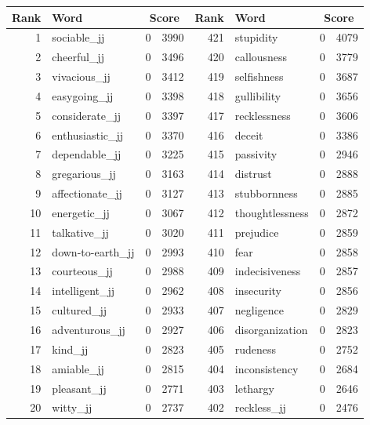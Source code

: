 \begin{table}[tbp]
    \begin{tabular}{| rlr@{.}l | rlr@{.}l |}
    \hline
    \textbf{Rank} & \textbf{Word} & \multicolumn{2}{c|}{\textbf{Score}} & \textbf{Rank} & \textbf{Word} & \multicolumn{2}{c|}{\textbf{Score}} \\
    \hline
    1 & sociable\_jj & 0 & 3990    &    421 & stupidity & 0 & 4079 \\
    2 & cheerful\_jj & 0 & 3496    &    420 & callousness & 0 & 3779 \\
    3 & vivacious\_jj & 0 & 3412    &    419 & selfishness & 0 & 3687 \\
    4 & easygoing\_jj & 0 & 3398    &    418 & gullibility & 0 & 3656 \\
    5 & considerate\_jj & 0 & 3397    &    417 & recklessness & 0 & 3606 \\
    6 & enthusiastic\_jj & 0 & 3370    &    416 & deceit & 0 & 3386 \\
    7 & dependable\_jj & 0 & 3225    &    415 & passivity & 0 & 2946 \\
    8 & gregarious\_jj & 0 & 3163    &    414 & distrust & 0 & 2888 \\
    9 & affectionate\_jj & 0 & 3127    &    413 & stubbornness & 0 & 2885 \\
    10 & energetic\_jj & 0 & 3067    &    412 & thoughtlessness & 0 & 2872 \\
    11 & talkative\_jj & 0 & 3020    &    411 & prejudice & 0 & 2859 \\
    12 & down-to-earth\_jj & 0 & 2993    &    410 & fear & 0 & 2858 \\
    13 & courteous\_jj & 0 & 2988    &    409 & indecisiveness & 0 & 2857 \\
    14 & intelligent\_jj & 0 & 2962    &    408 & insecurity & 0 & 2856 \\
    15 & cultured\_jj & 0 & 2933    &    407 & negligence & 0 & 2829 \\
    16 & adventurous\_jj & 0 & 2927    &    406 & disorganization & 0 & 2823 \\
    17 & kind\_jj & 0 & 2823    &    405 & rudeness & 0 & 2752 \\
    18 & amiable\_jj & 0 & 2815    &    404 & inconsistency & 0 & 2684 \\
    19 & pleasant\_jj & 0 & 2771    &    403 & lethargy & 0 & 2646 \\
    20 & witty\_jj & 0 & 2737    &    402 & reckless\_jj & 0 & 2476 \\

\end{tabular}
\end{table}
